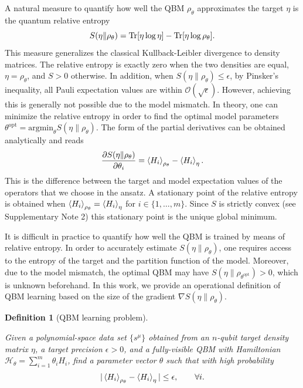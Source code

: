 \documentclass[
    reprint,
    aps,
    prx,
    longbibliography
]{revtex4-2}
\newtheorem{definition}{Definition}
\begin{document}
A natural measure to quantify how well the QBM $\rho_\theta$ approximates the target $\eta$ is the quantum relative entropy
\begin{equation}
\label{eq:RelEnt}
    S(\eta \| \rho_\theta) = \Tr[\eta \log{\eta}] - \Tr[\eta \log{\rho_\theta}]. 
\end{equation} 
This measure generalizes the classical Kullback-Leibler divergence to density matrices.
The relative entropy is exactly zero when the two densities are equal, $\eta=\rho_\theta$, and $S > 0$ otherwise. In addition, when $S(\eta \| \rho_\theta)\leq\epsilon$, by Pinsker's inequality, all Pauli expectation values are within $\mathcal{O}(\sqrt{\epsilon})$. However, achieving this is generally not possible due to the model mismatch. In theory, one can minimize the relative entropy in order to find the optimal model parameters $\theta^{\mathrm{opt}}=\mathrm{argmin}_{\theta}S(\eta \| \rho_\theta)$. The form of the partial derivatives can be obtained analytically and reads
\begin{equation}
\label{eq:RelEntropDeriv}
    \frac{\partial S(\eta\|\rho_\theta)}{\partial \theta_i} = \expval{H_i}_{\rho_\theta} - \expval{H_i}_\eta . 
\end{equation}
This is the difference between the target and model expectation values of the operators that we choose in the ansatz. A stationary point of the relative entropy is obtained when $\expval{H_i}_{\rho_\theta} = \expval{H_i}_\eta$ for $i \in \{1, \dots, m\}$. Since $S$ is strictly convex (see Supplementary Note 2) this stationary point is the unique global minimum. 

It is difficult in practice to quantify how well the QBM is trained by means of relative entropy. In order to accurately estimate $S(\eta\|\rho_\theta)$, one requires access to the entropy of the target and the partition function of the model. Moreover, due to the model mismatch, the optimal QBM may have $S(\eta \| \rho_{\theta^{\mathrm{opt}}})>0$, which is unknown beforehand. In this work, we provide an operational definition of QBM learning based on the size of the gradient $\nabla S(\eta \|\rho_\theta)$.

\begin{definition}[QBM learning problem]
\label{def:problem}

Given a polynomial-space data set $\{s^\mu\}$ obtained from an $n$-qubit target density matrix $\eta$, a target precision $\epsilon>0$, and a fully-visible QBM with Hamiltonian $\mathcal{H}_\theta =\sum_{i=1}^m \theta_i H_i$, find a parameter vector $\theta$ such that with high probability
\begin{equation}
\label{eq:problem_def}
    | \expval{H_i}_{\rho_{\theta}}  - \expval{H_i}_\eta | \leq \epsilon, \qquad \forall i .
\end{equation}
\end{definition}
\end{document}

